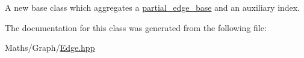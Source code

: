 A new base class which aggregates a \mbox{\hyperlink{classsequoia_1_1maths_1_1partial__edge__base}{partial\+\_\+edge\+\_\+base}} and an auxiliary index. 

The documentation for this class was generated from the following file\+:\begin{DoxyCompactItemize}
\item 
Maths/\+Graph/\mbox{\hyperlink{_edge_8hpp}{Edge.\+hpp}}\end{DoxyCompactItemize}
